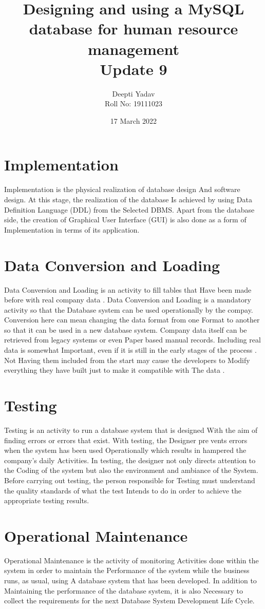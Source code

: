 \documentclass{article}
\title{ Designing and using a MySQL database for human resource management\\ Update 9}
\date{17 March 2022}
\author{Deepti Yadav\\ Roll No: 19111023 }
\begin{document}
\maketitle
\section*{Implementation}Implementation is the physical realization of database design And software
design. At this stage, the realization of the database Is achieved by using
Data Definition Language (DDL) from the Selected DBMS. Apart from the
database side, the creation of Graphical User Interface (GUI) is also done as
a form of Implementation in terms of its application.
\\
\section*{Data Conversion and Loading
}
Data Conversion and Loading is an activity to fill tables that Have been
made before with real company data . Data Conversion and Loading is a
mandatory activity so that the Database system can be used operationally
by the compay. Conversion here can mean changing the data format from
one Format to another so that it can be used in a new database system.
Company data itself can be retrieved from legacy systems or even Paperbased manual records. Including real data is somewhat Important, even if it
is still in the early stages of the process . Not Having them included from
the start may cause the developers to Modify everything they have built just
to make it compatible with The data .
\\
\section*{Testing}Testing is an activity to run a database system that is designed With the
aim of finding errors or errors that exist. With testing, the Designer prevents errors when the system has been used Operationally which results in
hampered the company’s daily Activities. In testing, the designer not only
directs attention to the Coding of the system but also the environment and
ambiance of the System. Before carrying out testing, the person responsible for Testing must understand the quality standards of what the test Intends
to do in order to achieve the appropriate testing results.
\\
\section*{Operational Maintenance} Operational Maintenance is the activity of monitoring Activities done within
the system in order to maintain the Performance of the system while the
business runs, as usual, using A database system that has been developed.
In addition to Maintaining the performance of the database system, it is
also Necessary to collect the requirements for the next Database System
Development Life Cycle.
\end{document}
